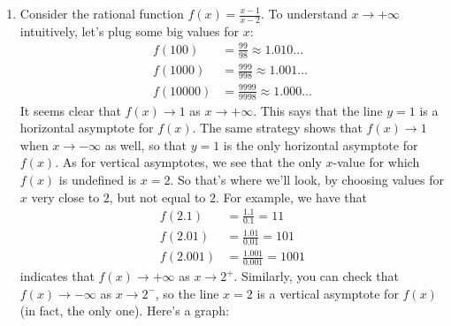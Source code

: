 \documentclass{ximera}
\begin{document}
\begin{example}
  \mbox{}
  \begin{enumerate}
  \item Consider the rational function $f(x) = \frac{x-1}{x-2}$. To understand $x\to +\infty$ intuitively, let's plug some big values for $x$:
    \begin{align*}
      f(100) &= \frac{99}{98} \approx 1.010... \\ f(1000) &= \frac{999}{998} \approx 1.001... \\ f(10000) &= \frac{9999}{9998} \approx 1.000...
    \end{align*}It seems clear that $f(x) \to 1$ as $x \to +\infty$. This says that the line $y=1$ is a horizontal asymptote for $f(x)$. The same strategy shows that $f(x) \to 1$ when $x \to -\infty$ as well, so that $y=1$ is the only horizontal asymptote for $f(x)$. As for vertical asymptotes, we see that the only $x$-value for which $f(x)$ is undefined is $x=2$. So that's where we'll look, by choosing values for $x$ very close to $2$, but not equal to $2$. For example, we have that
    \begin{align*}
      f(2.1) &= \frac{1.1}{0.1} = 11 \\ f(2.01) &= \frac{1.01}{0.01} = 101 \\ f(2.001) &= \frac{1.001}{0.001} = 1001 
    \end{align*}
    indicates that $f(x) \to +\infty$ as $x \to 2^+$. Similarly, you can check that $f(x) \to -\infty$ as $x \to 2^-$, so the line $x=2$ is a vertical asymptote for $f(x)$ (in fact, the only one). Here's a graph:

\begin{image}
\end{image}


\end{enumerate}
\end{example}
\end{document}
